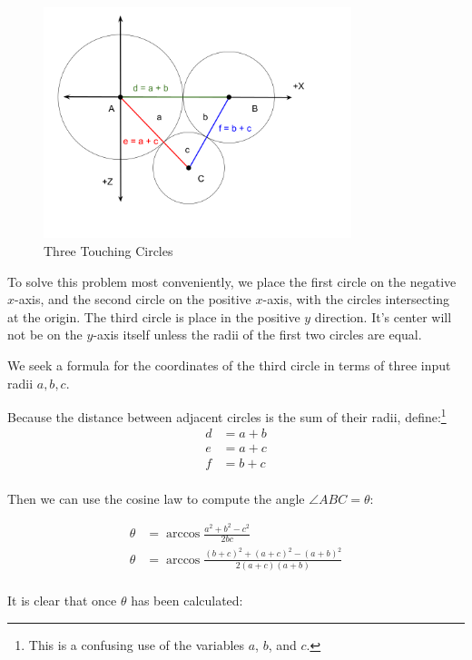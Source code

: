 \documentclass{article}
\begin{document}
\begin{figure}
     \centering
     \includegraphics[width=0.8\textwidth]{figures/ThreeTouchingPlanarCircles.png}
     \caption{Three Touching Circles}
  \label{fig:Tangent}
\end{figure}

To solve this problem most conveniently, we place the first circle on the negative $x$-axis, and the second circle
on the positive $x$-axis, with the circles intersecting at the origin.
The third circle is place in the positive $y$ direction. It's center will not be on the $y$-axis itself unless the
radii of the first two circles are equal.

We seek a formula for the coordinates of the third circle in terms of three input radii $a,b,c$.

Because the distance between adjacent circles is the sum of their radii, define:\footnote{This is a confusing use of the variables $a$, $b$, and $c$.}
\begin{align}
  d  &= a + b \\
  e  &= a + c \\
  f  &= b + c \\
\end{align}

Then we can use the cosine law to compute the angle $\angle ABC = \theta$:

\begin{align}
  \theta  &= \arccos{\frac{a^2 + b^2 - c^2}{2bc}} \\
  \theta  &= \arccos{\frac{(b+c)^2 + (a+c)^2 - (a+b)^2}{2(a+c)(a+b)}} \\
\end{align}

It is clear that once $\theta$ has been calculated:
\end{document}
